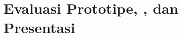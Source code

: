 \documentclass[../../main.tex]{subfiles}
\begin{document}
\chapter{Evaluasi Prototipe, , dan Presentasi}
\label{chap:playtesting}
























\ifSubfilesClassLoaded{%
  \clearpage
}{}
\end{document}
